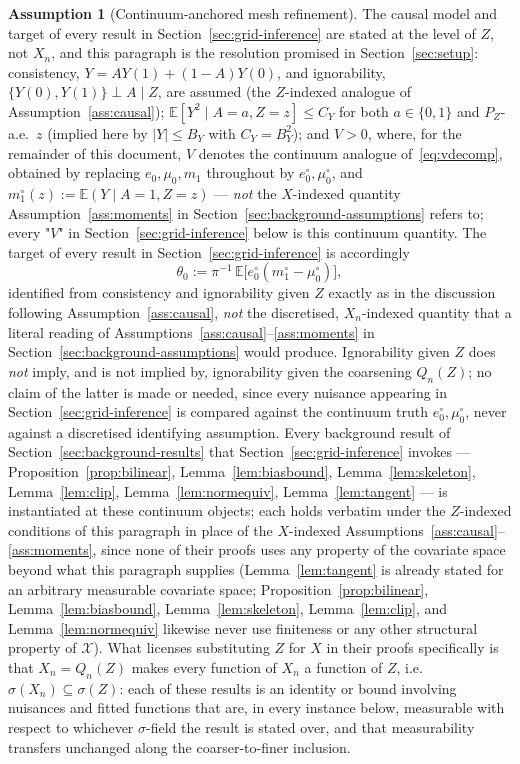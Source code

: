 \documentclass[11pt]{article}
\theoremstyle{plain}
\theoremstyle{definition}
\newtheorem{assumption}{Assumption}
\theoremstyle{remark}
\newcommand{\E}{\mathbb{E}}
\newcommand{\cX}{\mathcal{X}}
\newcommand{\ez}{e_0}
\newcommand{\mz}{\mu_0}
\begin{document}
\begin{assumption}[Continuum-anchored mesh refinement]
The causal model and target of every result in Section~\ref{sec:grid-inference}
are stated at the level of $Z$, not $X_n$, and this paragraph is the
resolution promised in Section~\ref{sec:setup}: consistency,
$Y=AY(1)+(1-A)Y(0)$, and ignorability, $\{Y(0),Y(1)\}\perp A\mid Z$, are
assumed (the $Z$-indexed analogue of Assumption~\ref{ass:causal});
$\E[Y^2\mid A=a,Z=z]\le C_Y$ for both $a\in\{0,1\}$ and $P_Z$-a.e.\ $z$
(implied here by $|Y|\le B_Y$ with $C_Y=B_Y^2$); and $V>0$, where, for the
remainder of this document, $V$ denotes the continuum analogue
of~\eqref{eq:vdecomp}, obtained by replacing $\ez,\mz,m_1$ throughout by
$\ez^\circ,\mz^\circ$, and $m_1^\circ(z):=\E(Y\mid A=1,Z=z)$ --- \emph{not}
the $X$-indexed quantity Assumption~\ref{ass:moments} in
Section~\ref{sec:background-assumptions} refers to; every "$V$" in
Section~\ref{sec:grid-inference} below is this continuum quantity. The
target of every result in Section~\ref{sec:grid-inference} is accordingly
\[
  \theta_0:=\pi^{-1}\,\E\bigl[\ez^\circ(m_1^\circ-\mz^\circ)\bigr],
\]
identified from consistency and ignorability given $Z$ exactly as in the
discussion following Assumption~\ref{ass:causal}, \emph{not} the
discretised, $X_n$-indexed quantity that a literal reading of
Assumptions~\ref{ass:causal}--\ref{ass:moments} in
Section~\ref{sec:background-assumptions} would produce. Ignorability given
$Z$ does \emph{not} imply, and is not implied by, ignorability given the
coarsening $Q_n(Z)$; no claim of the latter is made or needed, since every
nuisance appearing in Section~\ref{sec:grid-inference} is compared against
the continuum truth $\ez^\circ,\mz^\circ$, never against a discretised
identifying assumption. Every background result of
Section~\ref{sec:background-results} that Section~\ref{sec:grid-inference}
invokes --- Proposition~\ref{prop:bilinear}, Lemma~\ref{lem:biasbound},
Lemma~\ref{lem:skeleton}, Lemma~\ref{lem:clip}, Lemma~\ref{lem:normequiv},
Lemma~\ref{lem:tangent} --- is instantiated at these continuum objects; each
holds verbatim under the $Z$-indexed conditions of this paragraph in place
of the $X$-indexed Assumptions~\ref{ass:causal}--\ref{ass:moments}, since
none of their proofs uses any property of the covariate space beyond what
this paragraph supplies (Lemma~\ref{lem:tangent} is already stated for an
arbitrary measurable covariate space; Proposition~\ref{prop:bilinear},
Lemma~\ref{lem:biasbound}, Lemma~\ref{lem:skeleton}, Lemma~\ref{lem:clip},
and Lemma~\ref{lem:normequiv} likewise never use finiteness or any other
structural property of $\cX$). What licenses substituting $Z$ for $X$ in
their proofs specifically is that $X_n=Q_n(Z)$ makes every function of
$X_n$ a function of $Z$, i.e.\ $\sigma(X_n)\subseteq\sigma(Z)$: each of
these results is an identity or bound involving nuisances and fitted
functions that are, in every instance below, measurable with respect to
whichever $\sigma$-field the result is stated over, and that measurability
transfers unchanged along the coarser-to-finer inclusion.


\end{assumption}
\end{document}
